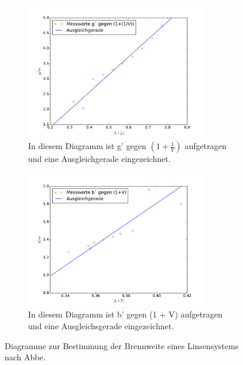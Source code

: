 \begin{figure}
  \centering
    \begin{subfigure}{0.48\textwidth}
      \includegraphics[height = 6cm]{plots/gsplot.pdf}
      \caption{In diesem Diagramm ist g' gegen
      \texorpdfstring{$\left(1 + \frac{1}{V}\right)$}{math} aufgetragen und
      eine Ausgleichgerade eingezeichnet. }
      \label{fig:Lgb}
    \end{subfigure}
    \begin{subfigure}{0.48\textwidth}
      \includegraphics[height = 6cm]{plots/bsplot.pdf}
      \caption{In diesem Diagramm ist b' gegen (1 + V) aufgetragen und
      eine Ausgleichsgerade eingezeichnet. }
      \label{fig:Wgb}
    \end{subfigure}
    \caption{Diagramme zur Bestimmung der Brennweite eines Linsensystems nach Abbe.}
\end{figure}
